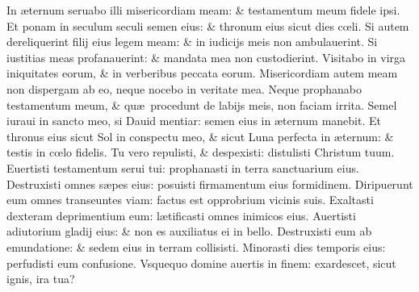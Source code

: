 \documentclass[a5paper,10pt]{book}
\def\ae{æ}
\def\oe{œ}
\begin{document}
\begin{multicols*}{2}
\newline \color{red} I\color{black}n \ae ternum seruabo illi misericordiam meam: \& testamentum meum fidele ipsi.
\newline \color{red} E\color{black}t ponam in seculum seculi semen eius: \& thronum eius sicut dies c\oe li.
\newline \color{red} S\color{black}i autem dereliquerint filij eius legem meam: \& in iudicijs meis non ambulauerint.
\newline \color{red} S\color{black}i iustitias meas profanauerint: \& mandata mea non custodierint.
\newline \color{red} V\color{black}isitabo in virga iniquitates eorum, \& in verberibus peccata eorum.
\newline \color{red} M\color{black}isericordiam autem meam non dispergam ab eo, neque nocebo in veritate mea.
\newline \color{red} N\color{black}eque prophanabo testamentum meum, \& qu\ae \ procedunt de labijs meis, non faciam irrita.
\newline \color{red} S\color{black}emel iuraui in sancto meo, si Dauid mentiar: semen eius in \ae ternum manebit.
\newline \color{red} E\color{black}t thronus eius sicut Sol in conspectu meo, \& sicut Luna perfecta in \ae ternum: \& testis in c\oe lo fidelis.
\newline \color{red} T\color{black}u vero repulisti, \& despexisti: distulisti Christum tuum.
\newline \color{red} E\color{black}uertisti testamentum serui tui: prophanasti in terra sanctuarium eius.
\newline \color{red} D\color{black}estruxisti omnes s\ae pes eius: posuisti firmamentum eius formidinem.
\newline \color{red} D\color{black}iripuerunt eum omnes transeuntes viam: factus est opprobrium vicinis suis.
\newline \color{red} E\color{black}xaltasti dexteram deprimentium eum: l\ae tificasti omnes inimicos eius.
\newline \color{red} A\color{black}uertisti adiutorium gladij eius: \& non es auxiliatus ei in bello.
\newline \color{red} D\color{black}estruxisti eum ab emundatione: \& sedem eius in terram collisisti.
\newline \color{red} M\color{black}inorasti dies temporis eius: perfudisti eum confusione.
\newline \color{red} V\color{black}squequo domine auertis in finem: exardescet, sicut ignis, ira tua?

\end{multicols*}
\end{document}

